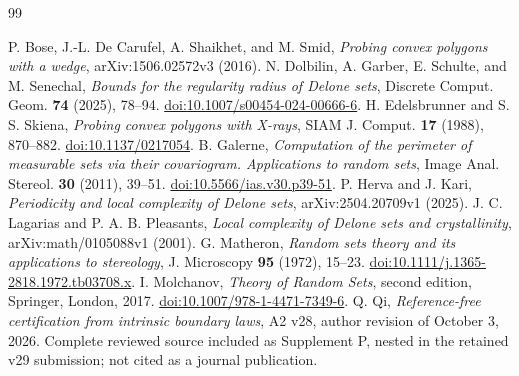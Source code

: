 \begin{thebibliography}{99}\raggedright
{}
P. Bose, J.-L. De Carufel, A. Shaikhet, and M. Smid,
\emph{Probing convex polygons with a wedge}, arXiv:1506.02572v3 (2016).
N. Dolbilin, A. Garber, E. Schulte, and M. Senechal,
\emph{Bounds for the regularity radius of Delone sets},
Discrete Comput. Geom. \textbf{74} (2025), 78--94.
\href{https://doi.org/10.1007/s00454-024-00666-6}{doi:10.1007/s00454-024-00666-6}.
H. Edelsbrunner and S. S. Skiena, \emph{Probing convex polygons with
X-rays}, SIAM J. Comput. \textbf{17} (1988), 870--882.
\href{https://doi.org/10.1137/0217054}{doi:10.1137/0217054}.
B. Galerne, \emph{Computation of the perimeter of measurable sets via
their covariogram. Applications to random sets}, Image Anal. Stereol.
\textbf{30} (2011), 39--51.
\href{https://doi.org/10.5566/ias.v30.p39-51}{doi:10.5566/ias.v30.p39-51}.
P. Herva and J. Kari, \emph{Periodicity and local complexity of Delone
sets}, arXiv:2504.20709v1 (2025).
J. C. Lagarias and P. A. B. Pleasants, \emph{Local complexity of Delone
sets and crystallinity}, arXiv:math/0105088v1 (2001).
G. Matheron, \emph{Random sets theory and its applications to stereology},
J. Microscopy \textbf{95} (1972), 15--23.
\href{https://doi.org/10.1111/j.1365-2818.1972.tb03708.x}{doi:10.1111/j.1365-2818.1972.tb03708.x}.
I. Molchanov, \emph{Theory of Random Sets}, second edition,
Springer, London, 2017.
\href{https://doi.org/10.1007/978-1-4471-7349-6}{doi:10.1007/978-1-4471-7349-6}.
Q. Qi, \emph{Reference-free certification from intrinsic boundary laws},
A2 v28, author revision of October 3, 2026. Complete reviewed source
included as Supplement P, nested in the retained v29 submission;
not cited as a journal publication.
\end{thebibliography}

